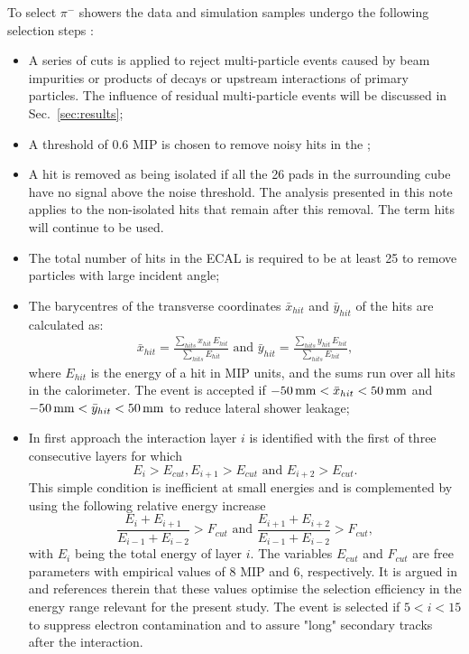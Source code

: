 To select $\pi^-$ showers the data and simulation samples undergo the following selection steps \cite{Bilki:2014uep}\cite{doublet:tel-00657967}: 
\begin{itemize}
	\item A series of cuts is applied to reject multi-particle events caused by beam impurities or products of decays or upstream interactions of primary particles. The influence of residual multi-particle events will be discussed in Sec.~\ref{sec:results};
	\item A threshold of 0.6 MIP is chosen to remove noisy hits in the \ecal;
	\item A hit is removed as being isolated if all the 26 pads in the surrounding cube have no signal above the noise threshold. The analysis presented in this note applies to the non-isolated hits that remain after this removal. The term hits will continue to be used.   
	\item The total number of hits in the ECAL is required to be at least 25 to remove particles with large incident angle;
	\item The barycentres of the transverse coordinates $\bar{x}_{hit}$ and $\bar{y}_{hit}$ of the hits are calculated as:
	\begin{eqnarray}
	\label{eq:barycentre}
	\bar{x}_{hit} = \frac{\displaystyle \sum_{hits} x_{hit}\,E_{hit}}{\displaystyle \sum_{hits} E_{hit}} 
	\text{ and }
	\bar{y}_{hit} = \frac{\displaystyle \sum_{hits} y_{hit}\,E_{hit}}{\displaystyle \sum_{hits} E_{hit}},
	\end{eqnarray}
	where $E_{hit}$ is the energy of a hit in MIP units, and the sums run over all hits in the calorimeter.
	The event is accepted if $-50\,{\rm mm} < \bar{x}_{hit} < 50\,{\rm mm}$ and $-50\,{\rm mm} < \bar{y}_{hit} < 50\,{\rm mm}$ to
	reduce lateral shower leakage;
	\item  In first approach the interaction layer $i$ is identified with the first of three consecutive layers for which
	\begin{equation}
	E_i > E_{cut}, E_{i+1} > E_{cut}  \text{ and } E_{i+2} > E_{cut}.
	\end{equation}
	This simple condition is inefficient at small energies and is complemented by using the following relative energy increase
	\begin{equation}
	\frac{E_i+E_{i+1}}{E_{i-1} + E_{i-2}} > F_{cut} \text{ and } 
	\frac{E_{i+1}+E_{i+2}}{E_{i-1} + E_{i-2}} > F_{cut}, 
	\end{equation}
	with $E_i$ being the total energy of layer $i$. The variables $E_{cut}$ and $F_{cut}$ are free parameters with empirical values of 8 MIP and 6, respectively. It is argued in \cite{Bilki:2014uep} and references therein that these values optimise the selection efficiency in the energy range relevant for the present study.
	The event is selected if $5 < i < 15$ to suppress electron contamination and to assure "long" secondary tracks after the interaction.
\end{itemize}
